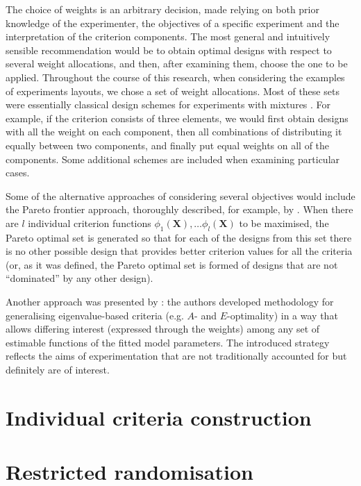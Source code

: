\documentclass[11pt]{article}
\begin{document}
The choice of weights is an arbitrary decision, made relying on both prior knowledge of the experimenter, the objectives of a specific experiment and the interpretation of the criterion components. The most general and intuitively sensible recommendation would be to obtain optimal designs with respect to several weight allocations, and then, after examining them, choose the one to be applied. Throughout the course of this research, when considering the examples of experiments layouts, we chose a set of weight allocations. Most of these sets were essentially classical design schemes for experiments with mixtures \citep{Cornell2011Mixtures}. For example, if the criterion consists of three elements, we would first obtain designs with all the weight on each component, then all combinations of distributing it equally between two components, and finally put equal weights on all of the components. Some additional schemes are included when examining particular cases.  

Some of the alternative approaches of considering several objectives would include the Pareto frontier approach, thoroughly described, for example, by \cite{Lu2011optimization}. When there are $l$ individual criterion functions $\phi_1(\bm{X}),\ldots\phi_{l}(\bm{X})$ to be maximised, the Pareto optimal set is generated so that for each of the designs from this set there is no other possible design that provides better criterion values for all the criteria (or, as it was defined, the Pareto optimal set is formed of designs that are not ``dominated'' by any other design).

Another approach was presented by \cite{Stallings2015general}: the authors developed methodology for generalising eigenvalue-based criteria (e.g. $A$- and $E$-optimality) in a way that allows differing interest (expressed through the weights) among any set of estimable functions of the fitted model parameters. The introduced strategy reflects the aims of experimentation that are not traditionally accounted for but definitely are of interest.

\section{Individual criteria construction}
\label{sec::criteria}


\section{Restricted randomisation}
\label{sec::ms_experiments}

\end{document}

